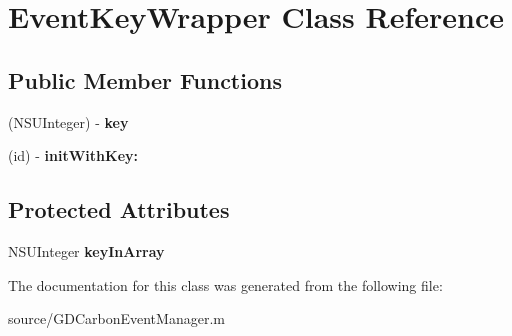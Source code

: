 \hypertarget{interface_event_key_wrapper}{
\section{EventKeyWrapper Class Reference}
\label{interface_event_key_wrapper}
}
\subsection*{Public Member Functions}
\begin{DoxyCompactItemize}
\item 
\hypertarget{interface_event_key_wrapper_aadb96c3d2f22a762e63bf6c3f6362e17}{
(NSUInteger) -\/ {\bfseries key}}
\label{interface_event_key_wrapper_aadb96c3d2f22a762e63bf6c3f6362e17}

\item 
\hypertarget{interface_event_key_wrapper_ab2ed0afe2d80835ca02187c59315159d}{
(id) -\/ {\bfseries initWithKey:}}
\label{interface_event_key_wrapper_ab2ed0afe2d80835ca02187c59315159d}

\end{DoxyCompactItemize}
\subsection*{Protected Attributes}
\begin{DoxyCompactItemize}
\item 
\hypertarget{interface_event_key_wrapper_afe7c15f44098176f90f28812bfdb810f}{
NSUInteger {\bfseries keyInArray}}
\label{interface_event_key_wrapper_afe7c15f44098176f90f28812bfdb810f}

\end{DoxyCompactItemize}


The documentation for this class was generated from the following file:\begin{DoxyCompactItemize}
\item 
source/GDCarbonEventManager.m\end{DoxyCompactItemize}
